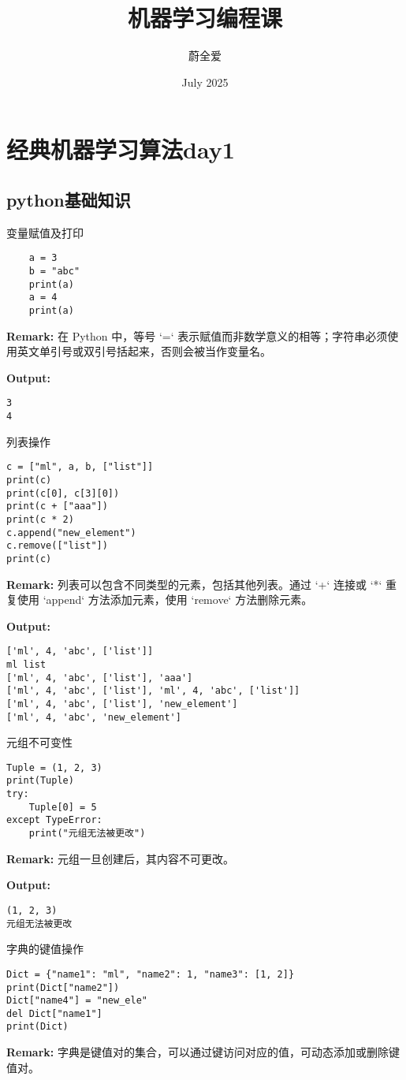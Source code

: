 \documentclass{article}
\title{机器学习编程课}
\author{蔚全爱}
\date{July 2025}
\begin{document}
\maketitle

\section{经典机器学习算法day1}

\subsection{python基础知识}

变量赋值及打印

\begin{lstlisting}
    a = 3
    b = "abc"
    print(a)
    a = 4
    print(a)
\end{lstlisting}
\textbf{Remark:} 在 Python 中，等号 `=` 表示赋值而非数学意义的相等；字符串必须使用英文单引号或双引号括起来，否则会被当作变量名。

\noindent\textbf{Output:}
\begin{verbatim}
3
4
\end{verbatim}
\par
列表操作
\begin{lstlisting}
c = ["ml", a, b, ["list"]]
print(c)
print(c[0], c[3][0])
print(c + ["aaa"])
print(c * 2)
c.append("new_element")
c.remove(["list"])
print(c)
\end{lstlisting}
\textbf{Remark:} 列表可以包含不同类型的元素，包括其他列表。通过 `+` 连接或 `*` 重复使用 `append` 方法添加元素，使用 `remove` 方法删除元素。

\textbf{Output:}
\begin{verbatim}
['ml', 4, 'abc', ['list']]
ml list
['ml', 4, 'abc', ['list'], 'aaa']
['ml', 4, 'abc', ['list'], 'ml', 4, 'abc', ['list']]
['ml', 4, 'abc', ['list'], 'new_element']
['ml', 4, 'abc', 'new_element']
\end{verbatim}

元组不可变性
\begin{lstlisting}
Tuple = (1, 2, 3)
print(Tuple)
try:
    Tuple[0] = 5
except TypeError:
    print("元组无法被更改")
\end{lstlisting}
\textbf{Remark:} 元组一旦创建后，其内容不可更改。

\textbf{Output:}
\begin{verbatim}
(1, 2, 3)
元组无法被更改
\end{verbatim}

字典的键值操作
\begin{lstlisting}
Dict = {"name1": "ml", "name2": 1, "name3": [1, 2]}
print(Dict["name2"])
Dict["name4"] = "new_ele"
del Dict["name1"]
print(Dict)
\end{lstlisting}
\textbf{Remark:} 字典是键值对的集合，可以通过键访问对应的值，可动态添加或删除键值对。
\end{document}
